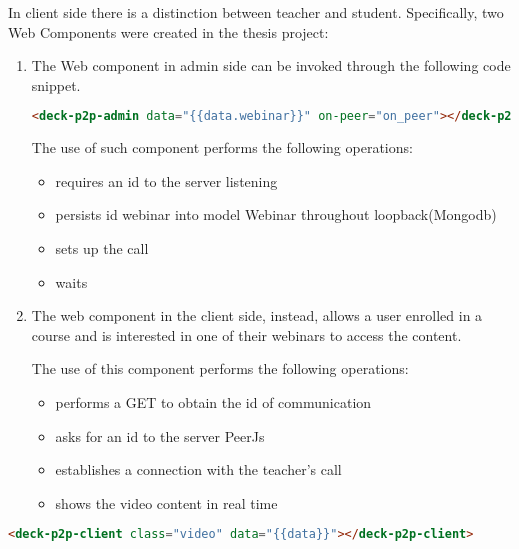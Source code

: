 In client side there is a distinction between teacher and student. Specifically, two Web Components were created in the thesis project:
\begin{enumerate}

\item The Web component in admin side can be invoked through the following code snippet.

\begin{lstlisting}[language=html]
 <deck-p2p-admin data="{{data.webinar}}" on-peer="on_peer"></deck-p2p-admin>
\end{lstlisting}


The use of such component performs the following operations:
\begin{itemize}
\item requires an id to the server listening
\item persists id webinar into model Webinar throughout loopback(Mongodb)
\item sets up the call
\item waits
\end{itemize}


\item 
The web component in the client side, instead, allows a user enrolled in a course and is interested in one of their webinars to access the content.

The use of this component performs the following operations:
\begin{itemize}
\item performs a GET to obtain the id of communication
\item asks for an id to the server PeerJs
\item establishes a connection with the teacher's call
\item shows the video content in real time
\end{itemize}

\end{enumerate}
\begin{lstlisting}[language=html]
  <deck-p2p-client class="video" data="{{data}}"></deck-p2p-client>
\end{lstlisting}


